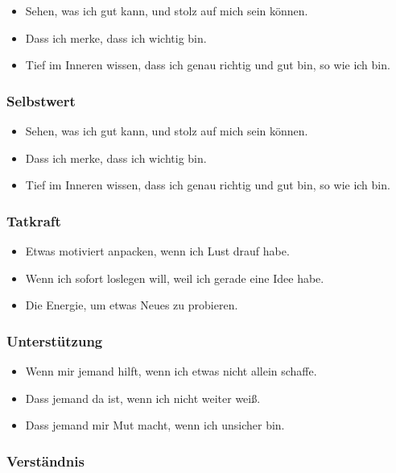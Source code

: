 \begin{itemize}
  \item Sehen, was ich gut kann, und stolz auf mich sein können.
  \item Dass ich merke, dass ich wichtig bin.
  \item Tief im Inneren wissen, dass ich genau richtig und gut bin, so wie ich bin.
\end{itemize}


\subsubsection{Selbstwert}

\begin{itemize}
  \item Sehen, was ich gut kann, und stolz auf mich sein können.
  \item Dass ich merke, dass ich wichtig bin.
  \item Tief im Inneren wissen, dass ich genau richtig und gut bin, so wie ich bin.
\end{itemize}


\subsubsection{Tatkraft}

\begin{itemize}
  \item Etwas motiviert anpacken, wenn ich Lust drauf habe.
  \item Wenn ich sofort loslegen will, weil ich gerade eine Idee habe.
  \item Die Energie, um etwas Neues zu probieren.
\end{itemize}


\subsubsection{Unterstützung}

\begin{itemize}
  \item Wenn mir jemand hilft, wenn ich etwas nicht allein schaffe.
  \item Dass jemand da ist, wenn ich nicht weiter weiß.
  \item Dass jemand mir Mut macht, wenn ich unsicher bin.
\end{itemize}


\subsubsection{Verständnis}

